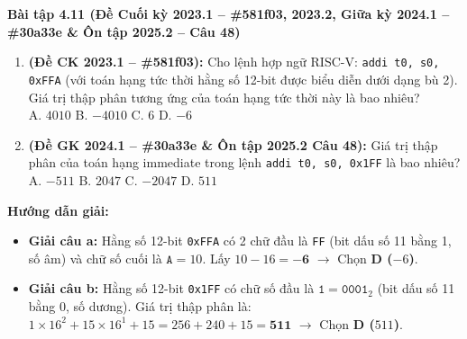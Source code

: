 \textbf{Bài tập 4.11 (Đề Cuối kỳ 2023.1 -- \#581f03, 2023.2, Giữa kỳ 2024.1 -- \#30a33e \& Ôn tập 2025.2 -- Câu 48)}
\begin{enumerate}[label=\alph*)]
    \item \textbf{(Đề CK 2023.1 -- \#581f03):} Cho lệnh hợp ngữ RISC-V: \texttt{addi t0, s0, 0xFFA} (với toán hạng tức thời hằng số 12-bit được biểu diễn dưới dạng bù 2). Giá trị thập phân tương ứng của toán hạng tức thời này là bao nhiêu?\\
    A. $4010$ \qquad B. $-4010$ \qquad C. $6$ \qquad D. $-6$
    \item \textbf{(Đề GK 2024.1 -- \#30a33e \& Ôn tập 2025.2 Câu 48):} Giá trị thập phân của toán hạng immediate trong lệnh \texttt{addi t0, s0, 0x1FF} là bao nhiêu?\\
    A. $-511$ \qquad B. $2047$ \qquad C. $-2047$ \qquad D. $511$
\end{enumerate}
\textbf{Hướng dẫn giải:}
\begin{itemize}
    \item \textbf{Giải câu a:} Hằng số 12-bit \texttt{0xFFA} có 2 chữ đầu là \texttt{FF} (bit dấu số 11 bằng 1, số âm) và chữ số cuối là $\texttt{A} = 10$. Lấy $10 - 16 = \mathbf{-6}$ $\rightarrow$ Chọn \textbf{D ($-6$)}.
    \item \textbf{Giải câu b:} Hằng số 12-bit \texttt{0x1FF} có chữ số đầu là $\texttt{1} = \texttt{0001}_2$ (bit dấu số 11 bằng 0, số dương). Giá trị thập phân là: $1 \times 16^2 + 15 \times 16^1 + 15 = 256 + 240 + 15 = \mathbf{511}$ $\rightarrow$ Chọn \textbf{D ($511$)}.
\end{itemize}


